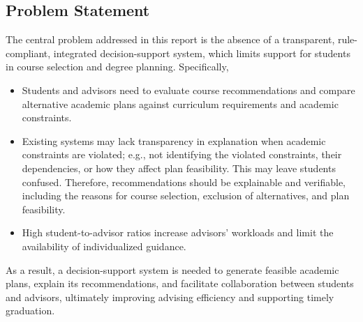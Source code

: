 
    \subsection{Problem Statement}

\hspace{\parindent}The central problem addressed in this report is the absence of a transparent, rule-compliant, integrated decision-support system, which limits support for students in course selection and degree planning. Specifically,
\begin{itemize}
    \item Students and advisors need to evaluate course recommendations and compare alternative academic plans against curriculum requirements and academic constraints.

    \item Existing systems may lack transparency in explanation when academic constraints are violated; e.g., not identifying the violated constraints, their dependencies, or how they affect plan feasibility. This may leave students confused. Therefore, recommendations should be explainable and verifiable, including the reasons for course selection, exclusion of alternatives, and plan feasibility.

    \item High student-to-advisor ratios increase advisors' workloads and limit the availability of individualized guidance.
\end{itemize}

As a result, a decision-support system is needed to generate feasible academic plans, explain its recommendations, and facilitate collaboration between students and advisors, ultimately improving advising efficiency and supporting timely graduation.


